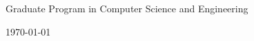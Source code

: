 \begin{titlepage}
\begin{center}



\vfill
Graduate Program in Computer Science and Engineering
\par
\today
\end{center}
\end{titlepage}

